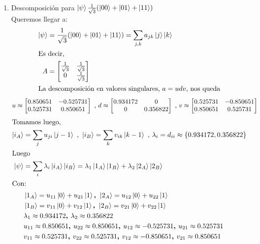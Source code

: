 \documentclass[a4paper]{article}
\begin{document}
\begin{enumerate}[label=(\alph*)]
    \item{Descomposición para $\ket{\psi} \frac{1}{\sqrt{3}}(\ket{00} + \ket{01} + \ket{11})$}\\
        Queremos llegar a:\\
    \begin{align*}
        \ket{\psi} &= \frac{1}{\sqrt{3}}(\ket{00} + \ket{01} + \ket{11}) = \sum_{j,k} a_{jk} \ket{j}\ket{k}\\
        \intertext{Es decir,}
        A &= 
            \begin{bmatrix}
                \frac{1}{\sqrt{3}} & \frac{1}{\sqrt{3}} \\
                0 & \frac{1}{\sqrt{3}} \\
            \end{bmatrix}\\
        \intertext{La descomposición en valores singulares, $a = udv$, nos queda}
    \end{align*}
    \[
         u \approx
        \begin{bmatrix}
            0.850651 & -0.525731 \\
            0.525731 & 0.850651 \\
        \end{bmatrix}
        \text{      ,       }
        d \approx 
        \begin{bmatrix}
            0.934172 & 0 \\
            0 & 0.356822 \\
        \end{bmatrix}
        \text{      ,       }
        v \approx 
        \begin{bmatrix}
            0.525731 & -0.850651 \\
            0.850651 & 0.525731 \\
        \end{bmatrix}\\
    \]
    \begin{align*}
        \intertext{Tomamos luego,}
        \ket{i_A} &= \sum_{j} u_{ji}\ket{j-1} \text{ , } \ket{i_B} = \sum_{k} v_{ik}\ket{k-1} \text{ , } \lambda_i = d_{ii} \approx \{0.934172, 0.356822\}\\
        \intertext{Luego}
        \ket{\psi} &= \sum_{i} \lambda_i \ket{i_A}\ket{i_B}= \lambda_1 \ket{1_A}\ket{1_B} + \lambda_2 \ket{2_A}\ket{2_B}\\
        \intertext{Con: }
        &\ket{1_A} = u_{11} \ket{0} + u_{21} \ket{1} \textbf{, }   \ket{2_A} = u_{12}\ket{0} + u_{22} \ket{1}\\
        &\ket{1_B} = v_{11} \ket{0} + v_{12} \ket{1}\textbf{, }  \ket{2_B} = v_{21} \ket{0} + v_{22} \ket{1}\\
        &\lambda_1 \approx 0.934172  \textbf{, } \lambda_2 \approx 0.356822\\
        &u_{11} \approx 0.850651 \textbf{, } u_{22}  \approx 0.850651 \textbf{, }  u_{12} \approx -0.525731 \textbf{, } u_{21} \approx 0.525731 \\
        &v_{11} \approx 0.525731 \textbf{, } v_{22} \approx 0.525731 \textbf{, }  v_{12} \approx -0.850651 \textbf{, } v_{21} \approx 0.850651 
    \end{align*}
  \end{enumerate}
\end{document}
